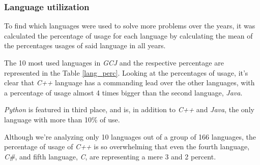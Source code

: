 \documentclass{article}
\begin{document}
\begin{multicols*}{2}


\subsubsection{Language utilization}

To find which languages were used to solve more problems over the years, it was calculated the percentage of usage for each language by calculating the mean of the percentages usages of said language in all years.

The 10 most used languages in \textit{GCJ} and the respective percentage are represented in the Table \ref{lang_perc}.
Looking at the percentages of usage, it's clear that \textit{C++} language has a commanding lead over the other languages, with a percentage of usage almost 4 times bigger than the second language, \textit{Java}.

\textit{Python} is featured in third place, and is, in addition to \textit{C++} and \textit{Java}, the only language with more than 10\% of use.

Although we're analyzing only 10 languages out of a group of 166 languages, the percentage of usage of \textit{C++} is so overwhelming that even the fourth language, \textit{C\#}, and fifth language, \textit{C}, are representing a mere 3 and 2 percent.


\end{multicols*}
\end{document}
